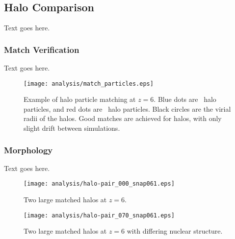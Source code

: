 \subsection{Halo Comparison}
\label{subsec:analysis--halo_comparison}


Text goes here.



\subsubsection{Match Verification}
\label{subsubsec:analysis--halo_comparison--match_verification}


Text goes here.

\begin{figure}[t]
	\centering
	\texttt{[image: analysis/match\_particles.eps]}
	\caption[Example of halo particle matching at $z = 6$.]{\footnotesize Example of halo particle matching at $z = 6$.  Blue dots are \lpt\ halo particles, and red dots are \za\ halo particles.  Black circles are the virial radii of the halos.  Good matches are achieved for halos, with only slight drift between simulations.}
	\label{fig:mass_profile}
\end{figure}



\subsubsection{Morphology}
\label{subsubsec:analysis--halo_comparison--morphology}


Text goes here.

\begin{figure}[t]
	\centering
	\texttt{[image: analysis/halo-pair\_000\_snap061.eps]}
	\caption[Comparison of two large well-fit companion halos $z = 6$.]{\footnotesize Two large matched halos at $z = 6$.}
	\label{fig:mass_profile}
\end{figure}

\begin{figure}[t]
	\centering
	\texttt{[image: analysis/halo-pair\_070\_snap061.eps]}
	\caption[Comparison of two large companion halos $z = 6$ with differing nuclear structure.]{\footnotesize Two large matched halos at $z = 6$ with differing nuclear structure.}
	\label{fig:mass_profile}
\end{figure}



